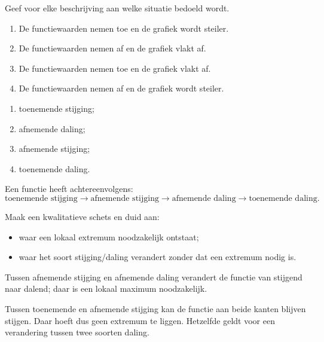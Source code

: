 \documentclass{ximera}
\begin{document}
\begin{oefening}{\oefU\ESS}

Geef voor elke beschrijving aan welke situatie bedoeld wordt.

\begin{enumerate}
  \item De functiewaarden nemen toe en de grafiek wordt steiler.
  \item De functiewaarden nemen af en de grafiek vlakt af.
  \item De functiewaarden nemen toe en de grafiek vlakt af.
  \item De functiewaarden nemen af en de grafiek wordt steiler.
\end{enumerate}

\begin{oplossing}
\begin{enumerate}
  \item toenemende stijging;
  \item afnemende daling;
  \item afnemende stijging;
  \item toenemende daling.
\end{enumerate}
\end{oplossing}

\end{oefening}





\begin{oefening}{\oefG}

Een functie heeft achtereenvolgens:
\[
\text{toenemende stijging}
\longrightarrow
\text{afnemende stijging}
\longrightarrow
\text{afnemende daling}
\longrightarrow
\text{toenemende daling}.
\]

Maak een kwalitatieve schets en duid aan:
\begin{itemize}
  \item waar een lokaal extremum noodzakelijk ontstaat;
  \item waar het soort stijging/daling verandert zonder dat een extremum nodig is.
\end{itemize}

\begin{oplossing}
Tussen afnemende stijging en afnemende daling verandert de functie van stijgend
naar dalend; daar is een lokaal maximum noodzakelijk.

Tussen toenemende en afnemende stijging kan de functie aan beide kanten blijven stijgen.
Daar hoeft dus geen extremum te liggen. Hetzelfde geldt voor een verandering
tussen twee soorten daling.
\end{oplossing}

\end{oefening}
\end{document}
